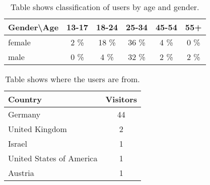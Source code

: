 \documentclass[preprint,12pt]{elsarticle}
\begin{document}



\newpage

\begin{center}
\begin{table}
\begin{tabular}{l | c c c c c}
Gender\textbackslash Age  & 13-17 & 18-24 & 25-34 & 45-54 & 55+\\
\hline
female  & 2 \% & 18 \% & 36 \% & 4 \% & 0 \%\\
male & 0 \% & 4 \% & 32 \% & 2 \%  & 2 \%\\
\end{tabular}
\caption{Table shows classification of users by age and gender.}
\label{tab:agegender}
\end{table}
\end{center}


\begin{center}
\begin{table}
\begin{tabular}{l | c }
Country  & Visitors \\
\hline
Germany  & 44 \\
United Kingdom & 2 \\
Israel & 1 \\
United States of America & 1 \\
Austria & 1 \\
\end{tabular}
\caption{Table shows where the users are from.}
\label{tab:countries}
\end{table}
\end{center}
\end{document}
